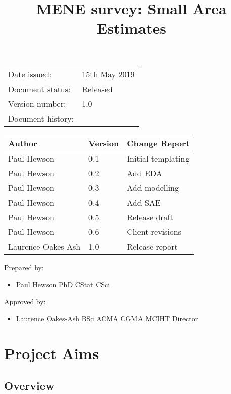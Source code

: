 \documentclass[12pt]{tufte-book}
\title{MENE survey: Small Area Estimates}
\begin{document}
\maketitle

\newpage
\begin{tabular}{ll}
{\color{blue}Date issued:} &  {\color{blue}15th May 2019}\\
{\color{blue}Document status:} & {\color{blue}Released}\\
{\color{blue}Version number:} & {\color{blue} 1.0}\\
{\color{blue}Document history:} & \\
\end{tabular}


\begin{tabular}{|l|l|l|}
\hline
Author & Version & Change Report \\
\hline
Paul Hewson & 0.1 & Initial templating\\
\hline
Paul Hewson & 0.2 & Add EDA \\
\hline
Paul Hewson & 0.3 & Add modelling \\
\hline
Paul Hewson & 0.4 & Add SAE \\
\hline
Paul Hewson & 0.5 & Release draft\\
\hline
Paul Hewson & 0.6 & Client revisions\\
\hline
Laurence Oakes-Ash & 1.0 & Release report\\
\hline

\end{tabular}                    

                    
{\color{blue}Prepared by:}
\begin{itemize}
\item[] Paul Hewson PhD CStat CSci
\end{itemize}

{\color{blue}Approved by:}
\begin{itemize}
\item[] Laurence Oakes-Ash BSc ACMA CGMA MCIHT Director
\end{itemize}

\newpage

\chapter{Project Aims}


\section{Overview}
\end{document}
